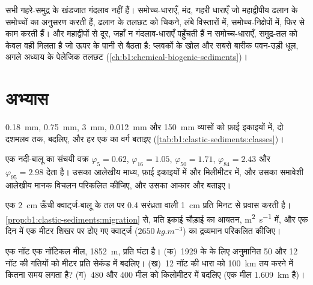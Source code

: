 सभी गहरे-समुद्र के खंडजात गंदलाव नहीं हैं। समोच्च-धाराएँ, मंद, गहरी धाराएँ जो महाद्वीपीय ढलान के समोच्चों का अनुसरण करती हैं, ढलान के तलछट को चिकने, लंबे विस्तारों में, समोच्च-निक्षेपों में, फिर से काम करती हैं। और महाद्वीपों से दूर, जहाँ न गंदलाव-धाराएँ पहुँचती हैं न समोच्च-धाराएँ, समुद्र-तल को केवल वही मिलता है जो ऊपर के पानी से बैठता है: प्लवकों के खोल और सबसे बारीक पवन-उड़ी धूल, अगले अध्याय के पेलेजिक तलछट (\cref{ch:b1:chemical-biogenic-sediments})।

\section{अभ्यास}

\begin{exercise}[$\star$]\label{exo:b1:clastic-sediments:1}
\qty{0.18}{mm}, \qty{0.75}{mm}, \qty{3}{mm}, \qty{0.012}{mm} और \qty{150}{mm} व्यासों को फ़ाई इकाइयों में, दो दशमलव तक, बदलिए, और हर एक का वर्ग बताइए (\cref{tab:b1:clastic-sediments:classes})।
\end{exercise}

\begin{exercise}[$\star$]\label{exo:b1:clastic-sediments:2}
एक नदी-बालू का संचयी वक्र $\varphi_5 = 0.62$, $\varphi_{16} =
1.05$, $\varphi_{50} = 1.71$, $\varphi_{84} = 2.43$ और $\varphi_{95} = 2.98$ देता है। उसका आलेखीय माध्य, फ़ाई इकाइयों में और मिलीमीटर में, और उसका समावेशी आलेखीय मानक विचलन परिकलित कीजिए, और उसका आकार और  बताइए।
\end{exercise}

\begin{exercise}[$\star$]\label{exo:b1:clastic-sediments:3}
एक \qty{2}{cm} ऊँची  क्वार्ट्ज-बालू के तल पर \num{0.4} सरंध्रता वाली \qty{1}{cm} प्रति मिनट से प्रवास करती है। \cref{prop:b1:clastic-sediments:migration} से, प्रति इकाई चौड़ाई  का आयतन, \si{m^2.s^{-1}} में, और एक दिन में एक मीटर शिखर पर ढोए गए क्वार्ट्ज ($\qty{2650}{kg.m^{-3}}$) का द्रव्यमान परिकलित कीजिए।
\end{exercise}

\begin{exercise}[$\star$]\label{exo:b1:clastic-sediments:4}
एक नॉट एक नॉटिकल मील, \qty{1852}{m}, प्रति घंटा है। (क)~1929 के  के लिए अनुमानित 50 और 12 नॉट की गतियों को मीटर प्रति सेकंड में बदलिए। (ख)~12 नॉट की धारा को \qty{100}{km} तय करने में कितना समय लगता है? (ग)~480 और 400 मील को किलोमीटर में बदलिए (एक मील \qty{1.609}{km} है)।
\end{exercise}

